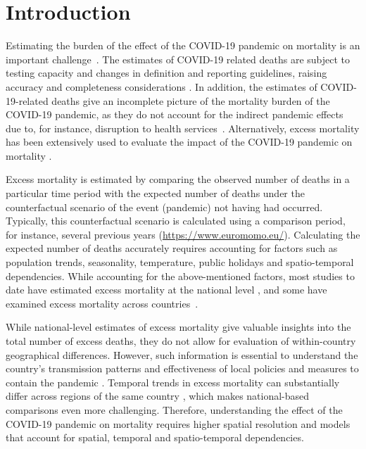 \section{Introduction}


Estimating the burden of the effect of the COVID-19 pandemic on mortality is an important challenge~\citep{weinberger2020estimation}. The estimates of COVID-19 related deaths are subject to testing capacity and changes in definition and reporting guidelines, raising accuracy and completeness considerations \citep{aburto2021estimating, konstantinoudis2021regional}. In addition, the estimates of COVID-19-related deaths give an incomplete picture of the mortality burden of the COVID-19 pandemic, as they do not account for the indirect pandemic effects due to, for instance, disruption to health services~\citep{kaczorowski2021beyond}. Alternatively, excess mortality has been extensively used to evaluate the impact of the COVID-19 pandemic on mortality \citep{rossen2020excess, islam2021excess, kontis2020magnitude, konstantinoudis2021regional, VerbeeckLMMCOVID}.

Excess mortality is estimated by comparing the observed number of deaths in a particular time period with the expected number of deaths under the counterfactual scenario of the event (pandemic) not having had occurred. Typically, this counterfactual scenario is calculated using a comparison period, for instance, several previous years (\url{https://www.euromomo.eu/}). Calculating the expected number of deaths accurately requires accounting for factors such as population trends, seasonality, temperature, public holidays and spatio-temporal dependencies. While accounting for the above-mentioned factors, most studies to date have estimated excess mortality at the national level \citep[see][]{rossen2020excess, weinberger2020estimation}, and some have examined excess mortality across countries~\citep{islam2021excess, kontis2020magnitude, kontis2021lessons}. 

While national-level estimates of excess mortality give valuable insights into the total number of excess deaths, they do not allow for evaluation of within-country geographical differences. However, such information is essential to understand the country's transmission patterns and effectiveness of local policies and measures to contain the pandemic \citep{kontopantelis2021excess}. Temporal trends in excess mortality can substantially differ across regions of the same country \citep{Blangiardo2020}, which makes national-based comparisons even more challenging. Therefore, understanding the effect of the COVID-19 pandemic on mortality requires higher spatial resolution and models that account for spatial, temporal and spatio-temporal dependencies. 

